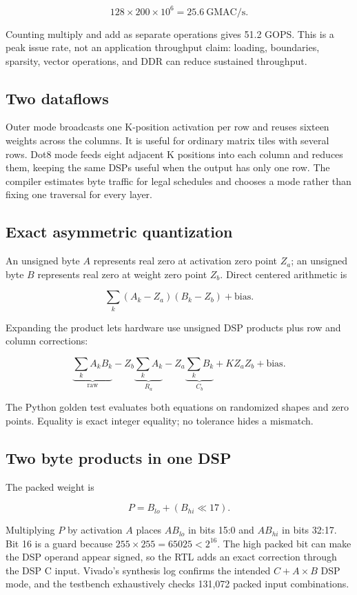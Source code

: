 \documentclass[10pt]{article}
\begin{document}
\[
  128\times200\times10^6=25.6\ \text{GMAC/s}.
\]

Counting multiply and add as separate operations gives 51.2 GOPS. This is a
peak issue rate, not an application throughput claim: loading, boundaries,
sparsity, vector operations, and DDR can reduce sustained throughput.

\subsection{Two dataflows}

Outer mode broadcasts one K-position activation per row and reuses sixteen
weights across the columns. It is useful for ordinary matrix tiles with several
rows. Dot8 mode feeds eight adjacent K positions into each column and reduces
them, keeping the same DSPs useful when the output has only one row. The
compiler estimates byte traffic for legal schedules and chooses a mode rather
than fixing one traversal for every layer.

\subsection{Exact asymmetric quantization}

An unsigned byte $A$ represents real zero at activation zero point $Z_a$; an
unsigned byte $B$ represents real zero at weight zero point $Z_b$. Direct
centered arithmetic is

\[
  \sum_k(A_k-Z_a)(B_k-Z_b)+\text{bias}.
\]

Expanding the product lets hardware use unsigned DSP products plus row and
column corrections:

\[
  \underbrace{\sum_k A_kB_k}_{\text{raw}}
  -Z_b\underbrace{\sum_k A_k}_{R_a}
  -Z_a\underbrace{\sum_k B_k}_{C_b}
  +KZ_aZ_b+\text{bias}.
\]

The Python golden test evaluates both equations on randomized shapes and zero
points. Equality is exact integer equality; no tolerance hides a mismatch.

\subsection{Two byte products in one DSP}

The packed weight is

\[
  P=B_{lo}+(B_{hi}\ll17).
\]

Multiplying $P$ by activation $A$ places $A B_{lo}$ in bits 15:0 and
$A B_{hi}$ in bits 32:17. Bit 16 is a guard because
$255\times255=65025<2^{16}$. The high packed bit can make the DSP operand appear
signed, so the RTL adds an exact correction through the DSP C input. Vivado's
synthesis log confirms the intended $C+A\times B$ DSP mode, and the testbench
exhaustively checks 131,072 packed input combinations.
\end{document}
